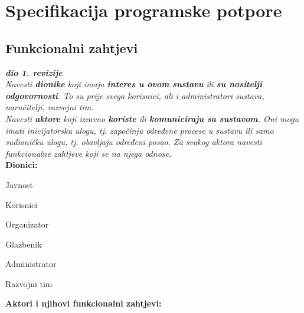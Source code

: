 \chapter{Specifikacija programske potpore}
		
	\section{Funkcionalni zahtjevi}
			
			\textbf{\textit{dio 1. revizije}}\\
			
			\textit{Navesti \textbf{dionike} koji imaju \textbf{interes u ovom sustavu} ili  \textbf{su nositelji odgovornosti}. To su prije svega korisnici, ali i administratori sustava, naručitelji, razvojni tim.}\\
				
			\textit{Navesti \textbf{aktore} koji izravno \textbf{koriste} ili \textbf{komuniciraju sa sustavom}. Oni mogu imati inicijatorsku ulogu, tj. započinju određene procese u sustavu ili samo sudioničku ulogu, tj. obavljaju određeni posao. Za svakog aktora navesti funkcionalne zahtjeve koji se na njega odnose.}\\
			
			
			\noindent \textbf{Dionici:}
			
			\begin{packed_enum}
				
				\item Javnost
				\item Korisnici
				\item Organizator
				\item Glazbenik 							
				\item Administrator
				\item Razvojni tim
			\end{packed_enum}
			
			\noindent \textbf{Aktori i njihovi funkcionalni zahtjevi:}
			
